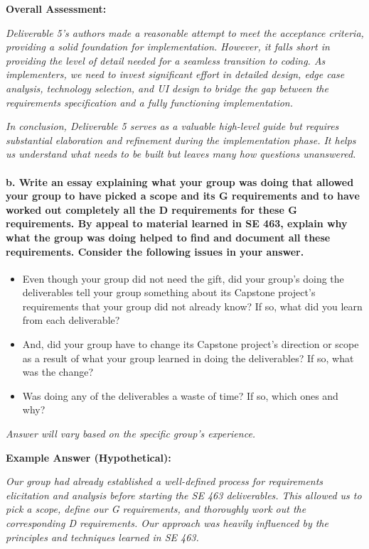 \documentclass{article}
\begin{document}
\textbf{Overall Assessment:}

\textit{Deliverable 5's authors made a reasonable attempt to meet the acceptance criteria, providing a solid foundation for implementation. However, it falls short in providing the level of detail needed for a seamless transition to coding. As implementers, we need to invest significant effort in detailed design, edge case analysis, technology selection, and UI design to bridge the gap between the requirements specification and a fully functioning implementation.}

\textit{In conclusion, Deliverable 5 serves as a valuable high-level guide but requires substantial elaboration and refinement during the implementation phase. It helps us understand \textit{what} needs to be built but leaves many \textit{how} questions unanswered.}

\paragraph{b. Write an essay explaining what your group was doing that allowed your group to have picked a scope and its G requirements and to have worked out completely all the D requirements for these G requirements. By appeal to material learned in SE 463, explain why what the group was doing helped to find and document all these requirements. Consider the following issues in your answer.}
\begin{itemize}
    \item Even though your group did not need the gift, did your group's doing the deliverables tell your group something about its Capstone project's requirements that your group did not already know? If so, what did you learn from each deliverable?
    \item And, did your group have to change its Capstone project's direction or scope as a result of what your group learned in doing the deliverables? If so, what was the change?
    \item Was doing any of the deliverables a waste of time? If so, which ones and why?
\end{itemize}

\textit{Answer will vary based on the specific group's experience.}

\textbf{Example Answer (Hypothetical):}

\textit{Our group had already established a well-defined process for requirements elicitation and analysis before starting the SE 463 deliverables. This allowed us to pick a scope, define our G requirements, and thoroughly work out the corresponding D requirements. Our approach was heavily influenced by the principles and techniques learned in SE 463.}
\end{document}
